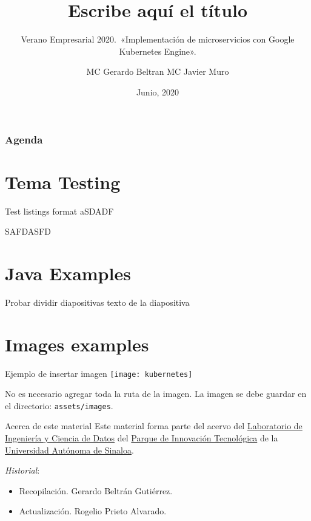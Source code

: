 \documentclass{beamer}
\title{Escribe aquí el título}
\subtitle{Verano Empresarial 2020.~«Implementación de microservicios con
	Google Kubernetes Engine».}
\author{MC Gerardo Beltran \textbar{} MC Javier Muro}
\date{Junio, 2020}
\institute{FIUAS \textbar{} PITUAS}
\begin{document}
\frame{\titlepage}

\renewcommand*\contentsname{Agenda}
\begin{frame}[allowframebreaks]
	\frametitle{Agenda}
	\tableofcontents[hideallsubsections]
\end{frame}

\section{Tema Testing}


\begin{frame}{Test listings format}
aSDADF

SAFDASFD
\end{frame}




\section{Java Examples}




	
	
\begin{frame}{Probar dividir diapositivas}
texto de la diapositiva
	
\end{frame}	
	
\section{Images examples}
\begin{frame}{Ejemplo de insertar imagen}
	\protect\hypertarget{ejemplo-de-insertar-imagen}{}
	\texttt{[image: kubernetes]}
	
	No es necesario agregar toda la ruta de la imagen. La imagen se debe guardar en el directorio: \texttt{assets/images}.
	
\end{frame}

\begin{frame}{Acerca de este material}
	\protect\hypertarget{acerca-de-este-material}{}
	Este material forma parte del acervo del
	\href{http://innovacion.uas.edu.mx/dsrg/}{Laboratorio de Ingeniería y
		Ciencia de Datos} del \href{http://innovacion.uas.edu.mx}{Parque de
		Innovación Tecnológica} de la \href{http://uas.edu.mx}{Universidad
		Autónoma de Sinaloa}.
	
	\vspace{1cm}
	
	\emph{Historial}:
	
	\begin{itemize}
		\item
		Recopilación. Gerardo Beltrán Gutiérrez.
		\item
		Actualización. Rogelio Prieto Alvarado.
	\end{itemize}
\end{frame}
	
	
\end{document}
